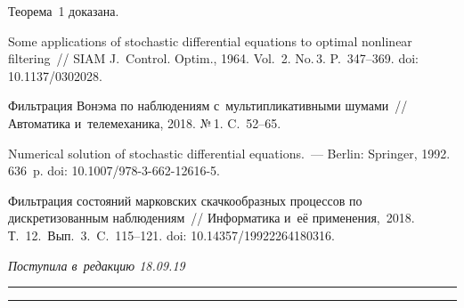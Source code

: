 \begin{multicols}{2}
{Теорема~1 доказана.


}

{\small\frenchspacing
 {%
 \begin{thebibliography}{9}

Some applications of stochastic differential equations to optimal nonlinear
filtering~// SIAM J.~Control. Optim., 1964. Vol.~2. No.\,3. P.~347--369. 
doi: 10.1137/0302028.

 Фильтрация Вонэма по наблюдениям с~мультипликативными шумами~// 
Автоматика и~телемеханика, 2018.
№\,1. C.~52--65. %

Numerical solution of stochastic differential equations.~--- 
Berlin: Springer, 1992. 636~p. doi: 10.1007/978-3-662-12616-5.

 Фильтрация состояний марковских 
скачкообразных процессов по дискретизованным наблюдениям~// Информатика и~её 
применения,~2018. Т.~12.~Вып.~3.~C.~115--121. doi: 10.14357/19922264180316.
    \end{thebibliography}

 }
 }

\end{multicols}

\vspace*{-6pt}

\hfill{\small\textit{Поступила в~редакцию 18.09.19}}

\vspace*{8pt}




\hrule

\vspace*{2pt}

\hrule


\def\tit{NUMERICAL SCHEMES OF MARKOV JUMP PROCESS FILTERING GIVEN DISCRETIZED 
OBSERVATIONS~I:\\ ACCURACY CHARACTERISTICS}


\def\titkol{Numerical schemes of Markov jump process filtering given discretized 
observations~I:~Accuracy characteristics}

